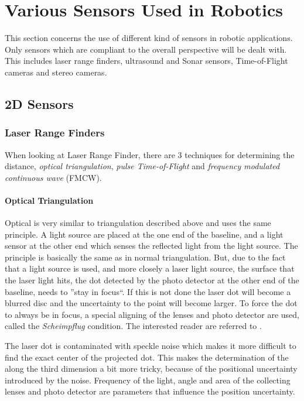 \section{Various Sensors Used in Robotics}
This section concerns the use of different kind of sensors in robotic applications. Only
sensors which are compliant to the overall perspective will be dealt with. This includes
laser range finders, ultrasound and Sonar sensors, Time-of-Flight cameras and
stereo cameras. 

\subsection{2D Sensors}

\subsubsection{Laser Range Finders}


When looking at Laser Range Finder, there are 3 techniques for determining the distance,
\emph{optical triangulation}, \emph{pulse Time-of-Flight} and \emph{frequency modulated
continuous wave} (FMCW). \cite{laser-ranging-critical-review}

\paragraph{Optical Triangulation}
Optical is very similar to triangulation described above and uses the same principle.
A light source are placed at the one end of the
baseline, and a light sensor at the other end which senses the reflected light from the
light source. The principle is basically the same as in normal triangulation. But, due to
the fact that a light source is used, and more closely a laser light source, the surface
that the laser light hits, the dot detected by the photo detector at the other end of the
baseline, needs to ''stay in focus``. If this is not done the laser dot will become a
blurred disc and the uncertainty to the point will become larger. To force the dot to
always be in focus, a special aligning of the lenses and photo detector are used, called 
the \emph{Scheimpflug} condition. The interested reader are referred to
\cite{laser-ranging-critical-review}.

The laser dot is contaminated with speckle noise which makes it more difficult to find the
exact center of the projected dot. This makes the determination of the along the third
dimension a bit more tricky, because of the positional uncertainty introduced by the
noise. Frequency of the light, angle and area of the collecting lenses and photo detector
are parameters that influence the position uncertainty. 


